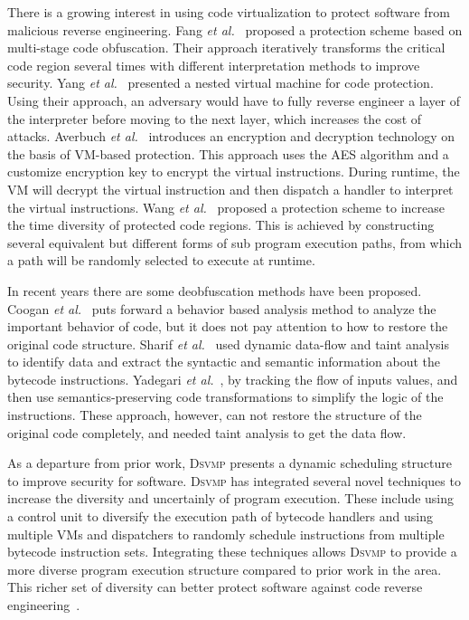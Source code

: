 \documentclass[preprint,12pt,3p]{elsarticle}
\newcommand{\DSVMP}{\textsc{Dsvmp}\xspace}
\begin{document}
There is a growing interest in using code virtualization to protect software from malicious reverse engineering.
Fang \emph{et al.}~\cite{5fang2011multi} proposed a protection scheme based on multi-stage code obfuscation.
Their approach iteratively transforms the critical code region several times with different interpretation methods to improve security.
Yang \emph{et al.}~\cite{6ming2011software} presented a nested virtual machine for code protection.
Using their approach, an adversary would have to fully reverse engineer a layer of the interpreter before moving to the next layer,
which increases the cost of attacks.
Averbuch \emph{et al.}~\cite{27averbuch2011efficient} introduces an encryption and decryption technology
on the basis of VM-based protection. This approach uses the AES algorithm and a customize encryption key
to encrypt the virtual instructions. During runtime, the VM will decrypt the virtual instruction and then
dispatch a handler to interpret the virtual instructions.
Wang \emph{et al.}~\cite{7wang2014tdvmp} proposed a protection scheme to increase the time diversity of protected code regions.
This is achieved by constructing several equivalent but different forms of sub program execution paths,
from which a path will be randomly selected to execute at runtime.

In recent years there are some deobfuscation methods have been proposed.
Coogan \emph{et al.}~\cite{coogan2011deobfuscation} puts forward a behavior based analysis method to analyze the important behavior of code, but it does not pay attention to how to restore the original code structure.
Sharif \emph{et al.}~\cite{sharif2009automatic} used dynamic data-flow and taint analysis to identify data and extract the syntactic and semantic information about the bytecode instructions.
Yadegari \emph{et al.}~\cite{Yadegari2015A}, by tracking the flow of inputs values, and then use semantics-preserving code transformations to simplify the logic of the instructions.
These approach, however, can not restore the structure of the original code completely, and needed taint analysis to get the data flow.

As a departure from prior work, \DSVMP presents a dynamic scheduling structure to improve security for software.
\DSVMP has integrated several novel techniques to increase the diversity and uncertainly of program execution.
These include using a control unit to diversify the execution path of bytecode handlers and using multiple VMs
and dispatchers to randomly schedule instructions from multiple bytecode instruction sets.
Integrating these techniques allows \DSVMP to provide a more diverse program execution structure compared to prior work in the area.
This richer set of diversity can better protect software against code reverse engineering~\cite{20larsen2014sok}.
\end{document}
